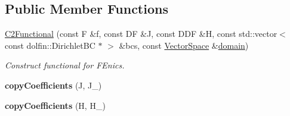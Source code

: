 \subsection*{Public Member Functions}
\begin{DoxyCompactItemize}
\item 
\hyperlink{classSpacy_1_1FEniCS_1_1C2Functional_a8f32c233a72dc3d25a656c1db12af943}{C2\-Functional} (const F \&f, const D\-F \&J, const D\-D\-F \&H, const std\-::vector$<$ const dolfin\-::\-Dirichlet\-B\-C $\ast$ $>$ \&bcs, const \hyperlink{classSpacy_1_1VectorSpace}{Vector\-Space} \&\hyperlink{classSpacy_1_1FunctionalBase_a2d3397deb9fa1ad85ed04e37a03b3aa6}{domain})
\begin{DoxyCompactList}\small\item\em Construct functional for F\-Enics. \end{DoxyCompactList}\item 
\hypertarget{classSpacy_1_1FEniCS_1_1C2Functional_a59b56b3469fa160b01fab4c84ec1e3eb}{{\bfseries copy\-Coefficients} (J, J\-\_\-)}\label{classSpacy_1_1FEniCS_1_1C2Functional_a59b56b3469fa160b01fab4c84ec1e3eb}

\item 
\hypertarget{classSpacy_1_1FEniCS_1_1C2Functional_ac42088dcb891793c06b598de210e5468}{{\bfseries copy\-Coefficients} (H, H\-\_\-)}\label{classSpacy_1_1FEniCS_1_1C2Functional_ac42088dcb891793c06b598de210e5468}


\end{DoxyCompactItemize}
